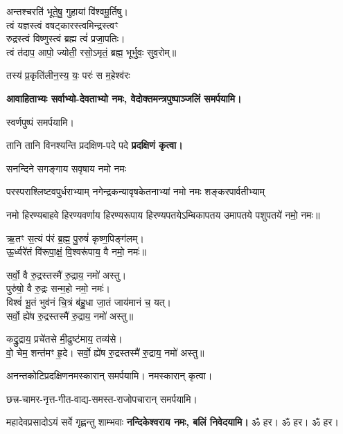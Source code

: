 \begin{center}
अन्तश्चरति॑ भूते॒षु॒ गुहायां वि॑श्वमू॒र्तिषु।\\
त्वं यज्ञस्त्वं वषट्कारस्त्वमिन्द्रस्त्वꣳ\\ रुद्रस्त्वं विष्णुस्त्वं ब्रह्म त्वं॑ प्रजा॒पतिः।\\
त्वं त॑दाप॒ आपो॒ ज्योती॒ रसो॒ऽमृतं॒ ब्रह्म॒ भूर्भुवः॒ सुव॒रोम्‌॥\medskip

{तस्य॑ प्र॒कृति॑लीन॒स्य॒ यः॒ परः॑ स म॒हेश्व॑रः}
\medskip

\textbf{आवाहिताभ्यः सर्वाभ्यो-देवताभ्यो नमः, वेदोक्तमन्त्रपुष्पाञ्जलिं समर्पयामि।}\medskip

स्वर्णपुष्पं समर्पयामि।\medskip

{तानि तानि विनश्यन्ति प्रदक्षिण-पदे पदे}
\textbf{प्रदक्षिणं कृत्वा।}
\medskip

{सनन्दिने सगङ्गाय सवृषाय नमो नमः}

{परस्पराश्लिष्टवपुर्धराभ्याम्}
{नगेन्द्रकन्यावृषकेतनाभ्यां}
{नमो नमः शङ्करपार्वतीभ्याम्}%

नमो हिरण्यबाहवे हिरण्यवर्णाय हिरण्यरूपाय हिरण्यपतये\-ऽम्बिकापतय उमापतये पशुपतये॑ नमो॒ नमः॥%

ऋ॒तꣳ स॒त्यं प॑रं ब्र॒ह्म॒ पु॒रुषं॑ कृष्ण॒पिङ्ग॑लम्।\\
ऊ॒र्ध्वरे॑तं वि॑रूपा॒क्षं॒ वि॒श्वरू॑पाय॒ वै नमो॒ नमः॑॥%

सर्वो॒ वै रु॒द्रस्तस्मै॑ रु॒द्राय॒ नमो॑ अस्तु।\\
पुरु॑षो॒ वै रु॒द्रः सन्म॒हो नमो॒ नमः॑।\\
विश्वं॑ भू॒तं भुव॑नं चि॒त्रं ब॑हु॒धा जा॒तं जाय॑मानं च॒ यत्।\\
सर्वो॒ ह्ये॑ष रु॒द्रस्तस्मै॑ रु॒द्राय॒ नमो॑ अस्तु॥%

कद्रु॒द्राय॒ प्रचे॑तसे मी॒ढुष्ट॑माय॒ तव्य॑से।\\
वो॒ चेम॒ शन्त॑मꣳ हृ॒दे।
सर्वो॒ ह्ये॑ष रु॒द्रस्तस्मै॑ रु॒द्राय॒ नमो॑ अस्तु॥%

अनन्तकोटिप्रदक्षिणनमस्कारान् समर्पयामि। नमस्कारान् कृत्वा।\medskip

छत्त्र-चामर-नृत्त-गीत-वाद्य-समस्त-राजोपचारान् समर्पयामि।\medskip

{महादेवप्रसादोऽयं सर्वे गृह्णन्तु शाम्भवाः}
\textbf{नन्दिकेश्वराय नमः, बलिं निवेदयामि।} ॐ हर। ॐ हर। ॐ हर।\medskip


\end{center}
